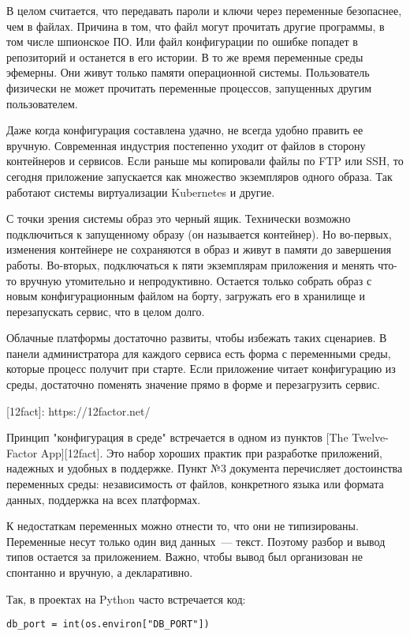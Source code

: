 В целом считается, что передавать пароли и ключи через переменные безопаснее,
чем в файлах. Причина в том, что файл могут прочитать другие программы, в том
числе шпионское ПО. Или файл конфигурации по ошибке попадет в репозиторий и
останется в его истории. В то же время переменные среды эфемерны. Они живут
только памяти операционной системы. Пользователь физически не может прочитать
переменные процессов, запущенных другим пользователем.

Даже когда конфигурация составлена удачно, не всегда удобно править ее
вручную. Современная индустрия постепенно уходит от файлов в сторону контейнеров
и сервисов. Если раньше мы копировали файлы по FTP или SSH, то сегодня
приложение запускается как множество экземпляров одного образа. Так работают
системы виртуализации Kubernetes и другие.

С точки зрения системы образ это черный ящик. Технически возможно подключиться к
запущенному образу (он называется контейнер). Но во-первых, изменения контейнере
не сохраняются в образ и живут в памяти до завершения работы. Во-вторых,
подключаться к пяти экземплярам приложения и менять что-то вручную утомительно и
непродуктивно. Остается только собрать образ с новым конфигурационным файлом на
борту, загружать его в хранилище и перезапускать сервис, что в целом долго.

Облачные платформы достаточно развиты, чтобы избежать таких сценариев. В панели
администратора для каждого сервиса есть форма с переменными среды, которые
процесс получит при старте. Если приложение читает конфигурацию из среды,
достаточно поменять значение прямо в форме и перезагрузить сервис.

[12fact]: https://12factor.net/

Принцип "конфигурация в среде" встречается в одном из пунктов [The Twelve-Factor
App][12fact]. Это набор хороших практик при разработке приложений, надежных и
удобных в поддержке. Пункт №3 документа перечисляет достоинства переменных
среды: независимость от файлов, конкретного языка или формата данных, поддержка
на всех платформах.

К недостаткам переменных можно отнести то, что они не типизированы. Переменные
несут только один вид данных~--- текст. Поэтому разбор и вывод типов остается за
приложением. Важно, чтобы вывод был организован не спонтанно и вручную, а
декларативно.

Так, в проектах на Python часто встречается код:

\begin{verbatim}
db_port = int(os.environ["DB_PORT"])
\end{verbatim}

